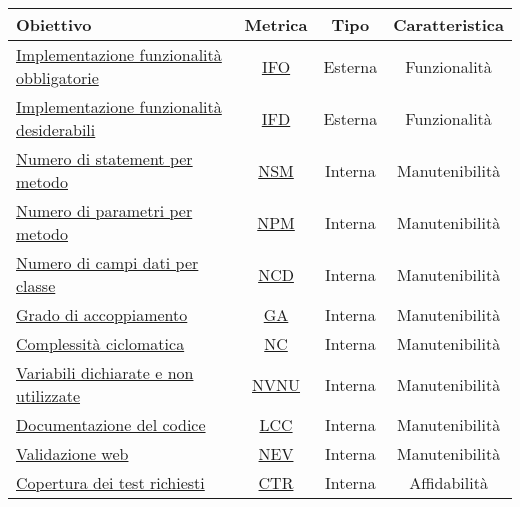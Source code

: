 				\begin{table}[H]
					\centering
					\small
					\begin{tabular}{l | c| c| c}
						\hline
						\textbf{Obiettivo}                         & \textbf{Metrica} & \textbf{Tipo} & \textbf{Caratteristica} \\ \hline
						\hyperref[OIDFO]{Implementazione  funzionalità obbligatorie} 						& \hyperref[MIDFO]{IFO}              & Esterna       & Funzionalità            \\
						\hyperref[OIDFD]{Implementazione funzionalità desiderabili}                         & \hyperref[MIDFD]{IFD}              & Esterna       & Funzionalità            \\
						\hyperref[OMECDC]{Numero di statement per metodo}                                   & \hyperref[MNDSPM]{NSM}              & Interna       & Manutenibilità          \\
						\hyperref[OMECDC]{Numero di parametri per metodo}                                    & \hyperref[MNDPPM]{NPM}              & Interna       & Manutenibilità          \\
						\hyperref[OMECDC]{Numero di campi dati per classe}                                   	& \hyperref[MNDCDPC]{NCD}              & Interna       & Manutenibilità          \\
						\hyperref[OMECDC]{Grado di accoppiamento}                                            	   & \hyperref[MGDA]{GA}               & Interna       & Manutenibilità          \\
						\hyperref[OMECDC]{Complessità ciclomatica}                                                   & \hyperref[MCCIC]{NC}               & Interna       & Manutenibilità          \\
						\hyperref[OMECDC]{Variabili dichiarate e non utilizzate}                                   & \hyperref[MNDVDENU]{NVNU}             & Interna       & Manutenibilità          \\
						\hyperref[ODDC]{Documentazione del codice}                                             & \hyperref[MDDC]{LCC}              & Interna       & Manutenibilità          \\
						\hyperref[OVW]{Validazione web}                                                              & \hyperref[MVW]{NEV}              & Interna       & Manutenibilità          \\
						\hyperref[OCDTR]{Copertura dei test richiesti}                                              & \hyperref[MCDTR]{CTR}              & Interna       & Affidabilità            \\

\end{tabular}
\end{table}
